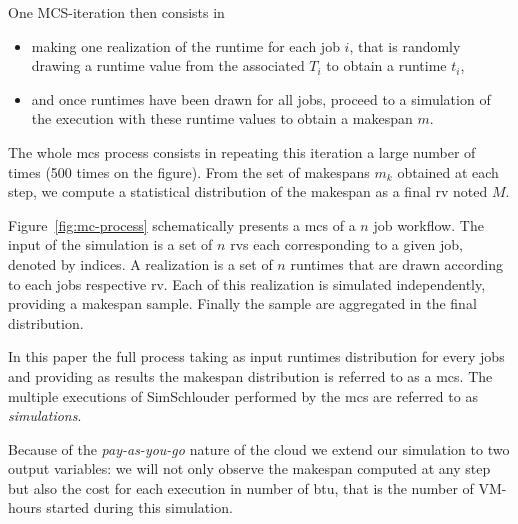 \documentclass[10pt,conference,compsocconf]{IEEEtran}
\begin{document}
One MCS-iteration then consists in 
\begin{itemize}
\item making one realization of the runtime  for each job $i$, that is randomly
  drawing a runtime value from the associated $T_i$ to obtain a runtime $t_i$,
\item and once runtimes have been drawn for all jobs, proceed to a simulation
  of the execution with these runtime values to obtain a makespan $m$.
\end{itemize}
The whole \ac{mcs} process  consists in repeating this iteration a  large number
of times (500 times  on the  figure). From the  set of makespans  $m_k$ obtained
at each step, we compute  a statistical distribution of the makespan  as a final
\ac{rv} noted $M$.

Figure~\ref{fig:mc-process}  schematically  presents a \ac{mcs}  of  a $n$  job
workflow.   The  input  of  the  simulation  is  a  set  of  $n$  \acp{rv}  each
corresponding to a given job, denoted by  indices. A realization is a set of $n$
runtimes that are drawn according to each jobs respective \ac{rv}.  Each of this
realization is  simulated independently,  providing a makespan  sample.  Finally
the sample are  aggregated in the final distribution.

In this paper the full process taking as input runtimes distribution for
every jobs and providing as results the makespan distribution is referred to as a
\acf{mcs}. The multiple executions of SimSchlouder performed by the \ac{mcs} are
referred to as \emph{simulations}.

Because of the \emph{pay-as-you-go} nature of the cloud we extend our simulation
to two output variables: we will not only observe the makespan computed at any
step but also the cost for each execution in number of \ac{btu}, that is the
number of VM-hours started during this simulation.
\end{document}
